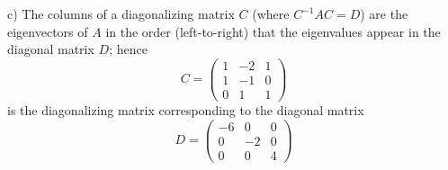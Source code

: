 \documentclass[12pt]{article}
\renewcommand{\=}[1]{\stackrel{#1}{=}} %
\theoremstyle{definition}
\begin{document}
c) The columns of a diagonalizing matrix $C$ (where $C^{-1}AC = D$) are the eigenvectors of $A$ in the order (left-to-right) that the eigenvalues appear in the diagonal matrix $D$; hence $$C = \begin{pmatrix}
    1 & -2 & 1\\
    1 & -1 & 0\\
    0 & 1 & 1
\end{pmatrix}$$is the diagonalizing matrix corresponding to the diagonal matrix $$D = \begin{pmatrix}
    -6 & 0 & 0\\
    0 & -2 & 0\\
    0 & 0 & 4
\end{pmatrix}$$
\end{document}
